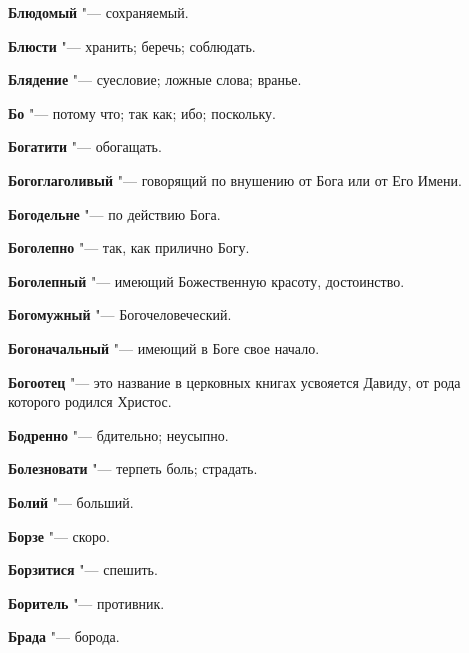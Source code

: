 \begin{mymulticols}{2}
\noindent\textbf{Блюдомый} "--- сохраняемый. 




\noindent\textbf{Блюсти} "--- хранить; беречь; соблюдать. 




\noindent\textbf{Блядение} "--- суесловие; ложные слова; вранье. 




\noindent\textbf{Бо} "--- потому что; так как; ибо; поскольку. 




\noindent\textbf{Богатити} "--- обогащать. 




\noindent\textbf{Богоглаголивый} "--- говорящий по внушению от Бога или от Его Имени. 




\noindent\textbf{Богодельне} "--- по действию Бога. 




\noindent\textbf{Боголепно} "--- так, как прилично Богу. 




\noindent\textbf{Боголепный} "--- имеющий Божественную красоту, достоинство. 




\noindent\textbf{Богомужный} "--- Богочеловеческий. 




\noindent\textbf{Богоначальный} "--- имеющий в Боге свое начало. 




\noindent\textbf{Богоотец} "--- это название в церковных книгах усвояется Давиду, от рода которого родился Христос. 




\noindent\textbf{Бодренно} "--- бдительно; неусыпно. 




\noindent\textbf{Болезновати} "--- терпеть боль; страдать. 




\noindent\textbf{Болий} "--- больший. 




\noindent\textbf{Борзе} "--- скоро. 




\noindent\textbf{Борзитися} "--- спешить. 




\noindent\textbf{Боритель} "--- противник. 




\noindent\textbf{Брада} "--- борода. 





\end{mymulticols}
